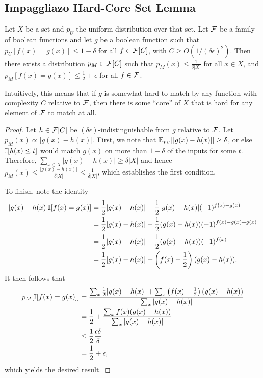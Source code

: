 \documentclass[11pt]{article}
\begin{document}
\subsection{Impaggliazo Hard-Core Set Lemma}
\begin{theorem}
Let $X$ be a set and $p_U$ the uniform distribution over that 
set. Let $\mathcal{F}$ be a family of boolean functions and let 
$g$ be a boolean function such that $p_U[f(x)=g(x)] \leq 1-\delta$ 
for all $f \in \mathcal{F}[C]$, with $C \geq O(1/(\delta\epsilon)^2)$. Then 
there exists a distribution $p_M \in \mathcal{F}[C]$ such that $p_M(x) \leq \frac{1}{\delta |X|}$ 
for all $x \in X$, and 
$p_M[f(x)=g(x)] \leq \frac{1}{2}+\epsilon$ for all $f \in \mathcal{F}$.
\end{theorem}
Intuitively, this means that if $g$ is somewhat hard to match by any function 
with complexity $C$ relative to $\mathcal{F}$, then there is some ``core'' of $X$ that 
is hard for any element of $\mathcal{F}$ to match at all.
\begin{proof}
Let $h \in \mathcal{F}[C]$ be $(\delta\epsilon)$-indistinguishable from $g$ 
relative to $\mathcal{F}$. Let $p_M(x) \propto |g(x)-h(x)|$. First, we note that 
$\mathbb{E}_{p_U}[|g(x)-h(x)|] \geq \delta$, or else $\mathbb{I}[h(x) \leq t]$ would match 
$g(x)$ on more than $1-\delta$ of the inputs for some $t$. Therefore, 
$\sum_{x \in X} |g(x)-h(x)| \geq \delta |X|$ and hence $p_M(x) \leq \frac{|g(x)-h(x)|}{\delta |X|} \leq \frac{1}{\delta |X|}$, 
which establishes the first condition.

To finish, note the identity 
\begin{align*}
|g(x)-h(x)| \mathbb{I}[f(x)=g(x)] &= \frac{1}{2}|g(x)-h(x)| + \frac{1}{2}|g(x)-h(x)|(-1)^{f(x)-g(x)} \\
 &= \frac{1}{2}|g(x)-h(x)| - \frac{1}{2}(g(x)-h(x))(-1)^{f(x)-g(x)+g(x)} \\ 
 &= \frac{1}{2}|g(x)-h(x)| - \frac{1}{2}(g(x)-h(x))(-1)^{f(x)} \\
 &= \frac{1}{2}|g(x)-h(x)| + \left(f(x)-\frac{1}{2}\right) (g(x)-h(x)).
\end{align*}
It then follows that 
\begin{align*}
p_M[\mathbb{I}[f(x)=g(x)]] &= \frac{\sum_{x} \frac{1}{2}|g(x)-h(x)| + \sum_{x} \left(f(x)-\frac{1}{2}\right) (g(x)-h(x))}{\sum_{x} |g(x)-h(x)|} \\
 &= \frac{1}{2} + \frac{\sum_{x} f(x)(g(x)-h(x))}{\sum_{x} |g(x)-h(x)|} \\
 &\leq \frac{1}{2} \frac{\epsilon\delta}{\delta} \\
 &= \frac{1}{2} + \epsilon,
\end{align*}
which yields the desired result.
\end{proof}
\end{document}
